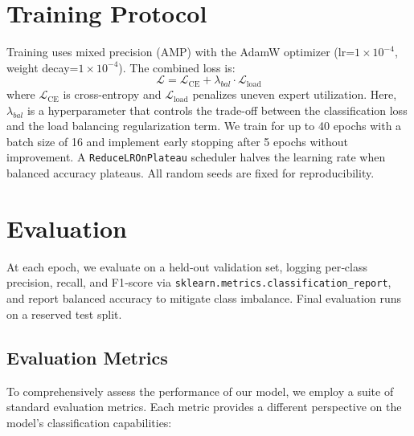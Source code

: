 \section{Training Protocol}
Training uses mixed precision (AMP) with the AdamW optimizer (lr=$1\times10^{-4}$, weight decay=$1\times10^{-4}$). The combined loss is:
\begin{equation}
\mathcal{L} = \mathcal{L}_{\mathrm{CE}} + \lambda_{bal} \cdot \mathcal{L}_{\mathrm{load}}
\end{equation}
where $\mathcal{L}_{\mathrm{CE}}$ is cross-entropy and $\mathcal{L}_{\mathrm{load}}$ penalizes uneven expert utilization. Here, $\lambda_{bal}$ is a hyperparameter that controls the trade-off between the classification loss and the load balancing regularization term. We train for up to 40 epochs with a batch size of 16 and implement early stopping after 5 epochs without improvement. A \texttt{ReduceLROnPlateau} scheduler halves the learning rate when balanced accuracy plateaus. All random seeds are fixed for reproducibility.

\section{Evaluation}
At each epoch, we evaluate on a held‑out validation set, logging per‑class precision, recall, and F1‑score via \texttt{sklearn.metrics.classification\_report}, and report balanced accuracy to mitigate class imbalance. Final evaluation runs on a reserved test split.

\subsection*{Evaluation Metrics}
To comprehensively assess the performance of our model, we employ a suite of standard evaluation metrics. Each metric provides a different perspective on the model's classification capabilities:

